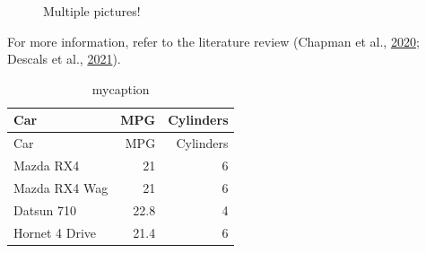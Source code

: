\documentclass[
]{article}
\begin{document}
\begin{figure}

\begin{minipage}[t]{0.50\linewidth}

{\centering 


}

\end{minipage}%
%
\begin{minipage}[t]{0.50\linewidth}

{\centering 


}

\end{minipage}%

\caption{\label{fig-elephants}Multiple pictures!}

\end{figure}

For more information, refer to the literature review (Chapman et al.,
\protect\hyperlink{ref-chapmanCompoundingImpactDeforestation2020}{2020};
Descals et al.,
\protect\hyperlink{ref-descalsHighresolutionGlobalMap2021}{2021}).

\hypertarget{tbl-mytable4}{}
\begin{longtable}[]{@{}lrr@{}}
\caption{\label{tbl-mytable4}mycaption}\tabularnewline
\toprule\noalign{}
Car & MPG & Cylinders \\
\midrule\noalign{}
\endfirsthead
\toprule\noalign{}
Car & MPG & Cylinders \\
\midrule\noalign{}
\endhead
\bottomrule\noalign{}
\endlastfoot
Mazda RX4 & 21 & 6 \\
Mazda RX4 Wag & 21 & 6 \\
Datsun 710 & 22.8 & 4 \\
Hornet 4 Drive & 21.4 & 6 \\
\end{longtable}
\end{document}
